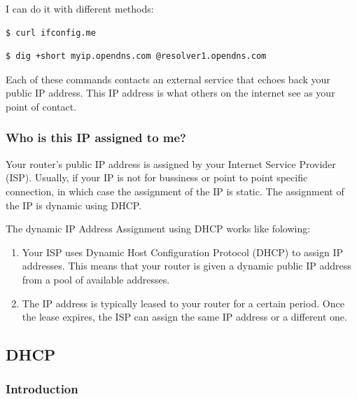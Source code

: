 \documentclass{article}
\newenvironment{codetemplate}[1][]{%
  \mybasecolorbox[#1]
  \itshape
}{%
  \endmybasecolorbox
}
\begin{document}
I can do it with different methods:

\begin{codetemplate}{}
\begin{verbatim}
$ curl ifconfig.me
\end{verbatim}
\end{codetemplate}

\begin{codetemplate}{}
\begin{verbatim}
$ dig +short myip.opendns.com @resolver1.opendns.com
\end{verbatim}
\end{codetemplate}

Each of these commands contacts an external service that echoes back your public IP address. This IP address is what others on the internet see as your point of contact.

\subsubsection{Who is this IP assigned to me?}

Your router's public IP address is assigned by your Internet Service Provider (ISP). Usually, if your IP is not for bussiness or point to point specific connection, in which case the assignment of the IP is static. The assignment of the IP is dynamic using DHCP.

The dynamic IP Address Assignment using DHCP works like folowing:

\begin{enumerate} 
    \item Your ISP uses Dynamic Host Configuration Protocol (DHCP) to assign IP addresses. This means that your router is given a dynamic public IP address from a pool of available addresses.
    \item The IP address is typically leased to your router for a certain period. Once the lease expires, the ISP can assign the same IP address or a different one.
\end{enumerate}

\subsection{DHCP}

\subsubsection{Introduction}
\end{document}
